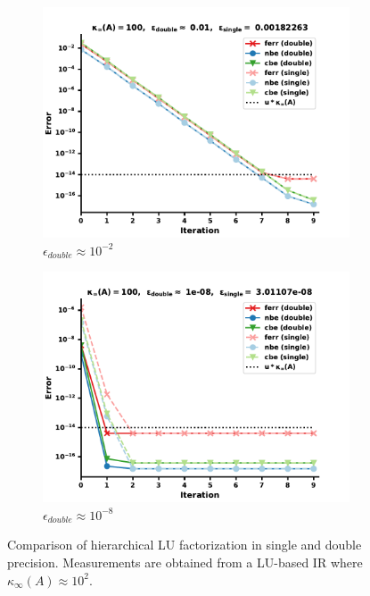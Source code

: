 \begin{figure}
\centering
\begin{subfigure}{.5\textwidth}
  \centering
  \includegraphics[width=\linewidth]{chapters/5_experiments/figures/LU512_e0_0s.pdf}
  \caption{$\epsilon_{double} \approx 10^{-2}$}
  \label{fig:lrirs1_1}
\end{subfigure}%
\begin{subfigure}{.5\textwidth}
  \centering
  \includegraphics[width=\linewidth]{chapters/5_experiments/figures/LU512_e0_1s.pdf}
  \caption{$\epsilon_{double} \approx 10^{-8}$}
  \label{fig:lrirs1_2}
\end{subfigure}
\caption[Mixed Precision Low-Rank LU-IR 1]{Comparison of hierarchical LU factorization in single and double precision. Measurements are obtained from a LU-based IR where $\kappa_\infty(A) \approx 10^2$.}
\label{fig:lrirs1}
\end{figure}

